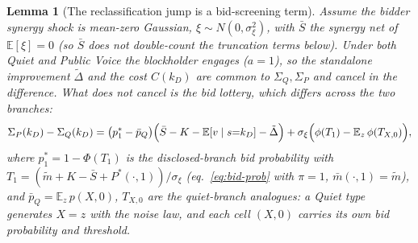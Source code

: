 \documentclass[11pt]{article}
\newtheorem{lemma}{Lemma}
\newcommand{\E}{\mathbb{E}}
\newcommand{\1}{\mathbf{1}}
\begin{document}
\begin{lemma}[The reclassification jump is a bid-screening term]
\label{lem:reclass-jump}
Assume the bidder synergy shock is mean-zero Gaussian, $\xi\sim N(0,\sigma_\xi^2)$,
with $\bar S$ the synergy \emph{net of} $\E[\xi]=0$ (so $\bar S$ does not
double-count the truncation terms below). Under both Quiet and Public Voice the
blockholder engages ($a=1$), so the standalone improvement $\tilde\Delta$ and the
cost $C(k_D)$ are common to $\Sigma_Q,\Sigma_P$ and cancel in the difference. What
does not cancel is the \emph{bid lottery}, which differs across the two branches:
\begin{equation}
\Sigma_P(k_D)-\Sigma_Q(k_D)
 =\bigl(p_1^{\ast}-\bar p_Q\bigr)\Big(\bar S-K-\E[v\mid s{=}k_D]-\tilde\Delta\Big)
   +\sigma_\xi\Bigl(\phi(T_1)-\E_z\,\phi(T_{X,0})\Bigr),
\label{eq:reclass-real}
\end{equation}
where $p_1^{\ast}=1-\Phi(T_1)$ is the disclosed-branch bid probability with
$T_1=(\tilde m+K-\bar S+P^{\ast}(\cdot,1))/\sigma_\xi$ (eq.~\eqref{eq:bid-prob}
with $\pi=1$, $\bar m(\cdot,1)=\tilde m$), and $\bar p_Q=\E_z\,p(X,0)$,
$T_{X,0}$ are the quiet-branch analogues: a Quiet type generates $X=z$ with the
noise law, and each cell $(X,0)$ carries its own bid probability and threshold.
\end{lemma}
\end{document}
